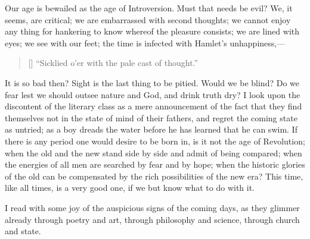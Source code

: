 Our age is bewailed as the age of Introversion. Must that needs be
evil? We, it seems, are critical; we are embarrassed with second
thoughts; we cannot enjoy any thing for hankering to know whereof the
pleasure consists; we are lined with eyes; we see with our feet; the
time is infected with Hamlet's unhappiness,---

\settowidth{}
\begin{verse}[\versewidth]
``Sicklied o'er with the pale cast of thought.''
\end{verse}

\noindent It is so bad then? Sight is the last thing to be pitied.
Would we be blind? Do we fear lest we should outsee nature and God,
and drink truth dry? I look upon the discontent of the literary class
as a mere announcement of the fact  that they find
themselves not in the state of mind of their fathers, and regret the
coming state as untried; as a boy dreads the water before he has
learned that he can swim. If there is any period one would desire to
be born in, is it not the age of Revolution; when the old and the new
stand side by side and admit of being compared; when the energies of
all men are searched by fear and by hope; when the historic glories of
the old can be compensated by the rich possibilities of the new era?
This time, like all times, is a very good one, if we but know what to
do with it.

I read with some joy of the auspicious signs of the coming days, as
they glimmer already through poetry and art, through philosophy and
science, through church and state.

